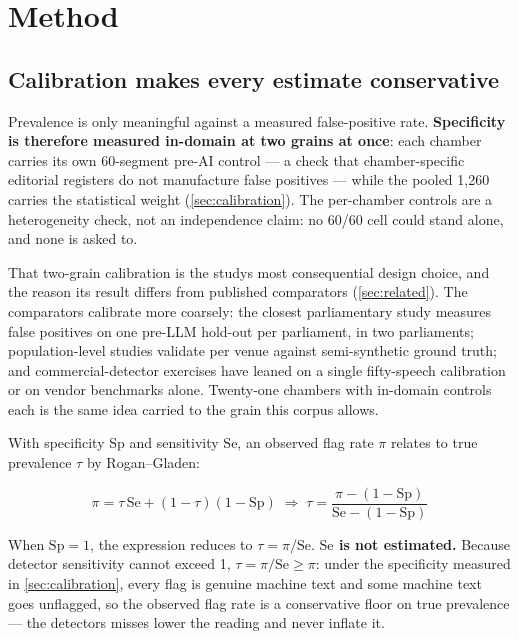 \section{Method}\label{sec:method}

\subsection{Calibration makes every estimate conservative}\label{sec:calibration-method}

Prevalence is only meaningful against a measured false-positive rate.
\textbf{Specificity is therefore measured in-domain at two grains at once}: each
chamber carries its own 60-segment pre-AI control --- a check that
chamber-specific editorial registers do not manufacture false positives ---
while the pooled 1,260 carries the statistical weight (\cref{sec:calibration}). The
per-chamber controls are a heterogeneity check, not an independence claim:
no 60/60 cell could stand alone, and none is asked to.

That two-grain calibration is the study\textquotesingle s most consequential design choice,
and the reason its result differs from published comparators (\cref{sec:related}). The
comparators calibrate more coarsely: the closest parliamentary study\cite{suvanto2026} measures false positives on one pre-LLM hold-out per parliament, in two
parliaments; population-level studies\cite{liang2024monitoring} validate per venue against
semi-synthetic ground truth; and commercial-detector exercises have leaned
on a single fifty-speech calibration\cite{rice2026} or on vendor benchmarks alone.
Twenty-one chambers with in-domain controls each is the same idea carried
to the grain this corpus allows.

With specificity \(\mathrm{Sp}\) and sensitivity \(\mathrm{Se}\), an observed flag rate \(\pi\) relates
to true prevalence \(\tau\) by Rogan--Gladen\cite{rogan1978}:

\[ \pi = \tau\,\mathrm{Se} + (1-\tau)(1-\mathrm{Sp}) \;\Rightarrow\; \tau = \frac{\pi - (1-\mathrm{Sp})}{\mathrm{Se} - (1-\mathrm{Sp})} \]

When \(\mathrm{Sp} = 1\), the expression reduces to \(\tau = \pi/\mathrm{Se}\). \textbf{\(\mathrm{Se}\) is not estimated.} Because detector sensitivity cannot exceed 1, \(\tau = \pi/\mathrm{Se} \geq \pi\): under the specificity measured in \cref{sec:calibration}, every flag is genuine machine text and some machine text goes unflagged, so the observed flag rate is a conservative floor on true prevalence --- the detector\textquotesingle s misses lower the reading and never inflate it.

